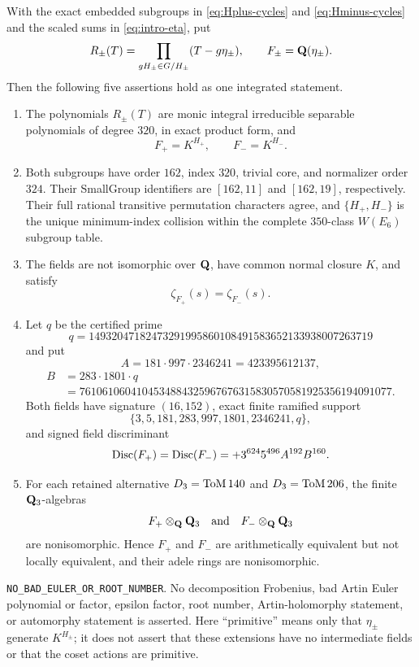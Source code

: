\begin{theorem}
\label{thm:integrated}
With the exact embedded subgroups in \eqref{eq:Hplus-cycles} and
\eqref{eq:Hminus-cycles} and the scaled sums in \eqref{eq:intro-eta}, put
\[
 R_\pm(T)=\prod_{gH_\pm\in G/H_\pm}(T-g\eta_\pm),
 \qquad F_\pm=\mathbf{Q}(\eta_\pm).
\]
Then the following five assertions hold as one integrated statement.
\begin{enumerate}[label=\textup{(\roman*)},leftmargin=2.6em]
\item The polynomials $R_\pm(T)$ are monic integral irreducible separable
polynomials of degree $320$, in exact product form, and
\[
  F_+=K^{H_+},\qquad F_-=K^{H_-}.
\]
\item Both subgroups have order $162$, index $320$, trivial core, and
normalizer order $324$.  Their SmallGroup identifiers are $[162,11]$ and
$[162,19]$, respectively.  Their full rational transitive permutation
characters agree, and $\{H_+,H_-\}$ is the unique minimum-index collision
within the complete $350$-class $W(E_6)$ subgroup table.
\item The fields are not isomorphic over $\mathbf{Q}$, have common normal closure
$K$, and satisfy
\[
   \zeta_{F_+}(s)=\zeta_{F_-}(s).
\]
\item Let $q$ be the certified prime
\[
 q=14932047182473291995860108491583652133938007263719
\]
and put
\[
 A=181\cdot997\cdot2346241=423395612137,
\]
\[
 \begin{aligned}
 B&=283\cdot1801\cdot q\\
  &=7610610604104534884325967676315830570581925356194091077.
 \end{aligned}
\]
Both fields have signature $(16,152)$, exact finite ramified support
\[
 \{3,5,181,283,997,1801,2346241,q\},
\]
and signed field discriminant
\[
 \operatorname{Disc}(F_+)=\operatorname{Disc}(F_-)=+3^{624}5^{496}A^{192}B^{160}.
\]
\item For each retained alternative $D_3=\mathrm{ToM}\,140$ and
$D_3=\mathrm{ToM}\,206$, the finite \etale{} $\mathbf{Q}_{3}$-algebras
\[
 F_+\otimes_{\mathbf{Q}}\mathbf{Q}_{3}
 \quad\text{and}\quad
 F_-\otimes_{\mathbf{Q}}\mathbf{Q}_{3}
\]
are nonisomorphic.  Hence $F_+$ and $F_-$ are arithmetically equivalent
but not locally equivalent, and their adele rings are nonisomorphic.
\end{enumerate}
\end{theorem}


\FloatBarrier

\noindent\texttt{NO\_BAD\_EULER\_OR\_ROOT\_NUMBER}.  No decomposition
Frobenius, bad Artin Euler polynomial or factor, epsilon factor, root
number, Artin-holomorphy statement, or automorphy statement is asserted.
Here ``primitive'' means only that $\eta_\pm$ generate $K^{H_\pm}$; it does
not assert that these extensions have no intermediate fields or that the
coset actions are primitive.

